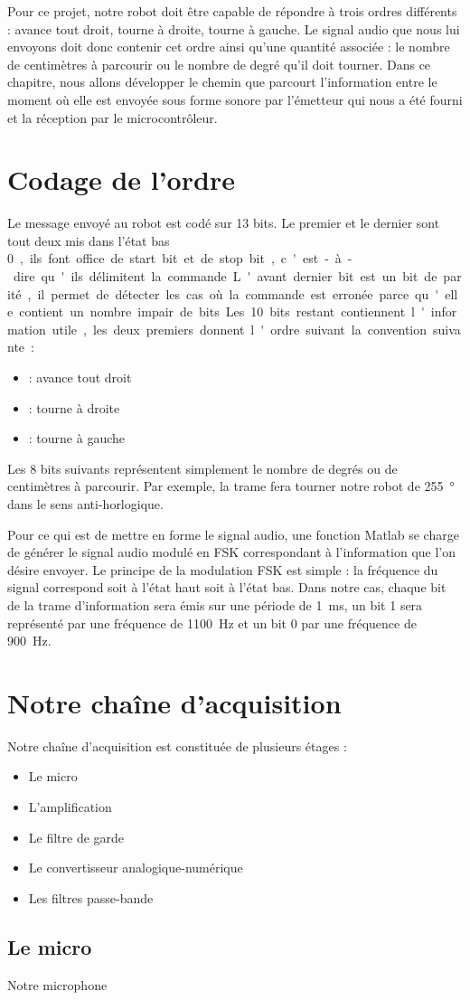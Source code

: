 Pour ce projet, notre robot doit être capable de répondre à trois ordres différents : avance tout droit, tourne à droite, tourne à gauche. Le signal audio que nous lui envoyons doit donc contenir cet ordre ainsi qu'une quantité associée : le nombre de centimètres à parcourir ou le nombre de degré qu'il doit tourner. Dans ce chapitre, nous allons développer le chemin que parcourt l'information entre le moment où elle est envoyée sous forme sonore par l'émetteur qui nous a été fourni et la réception par le microcontrôleur.

\section{Codage de l'ordre}
Le message envoyé au robot est codé sur 13 bits. Le premier et le dernier sont tout deux mis dans l'état bas \SI{0}, ils font office de start bit et de stop bit, c'est-à-dire qu'ils délimitent la commande. L'avant dernier bit est un bit de parité, il permet de détecter les cas où la commande est erronée parce qu'elle contient un nombre impair de bits. Les \SI{10} bits restant contiennent l'information utile, les deux premiers donnent l'ordre suivant la convention suivante :
\begin{itemize}
\item {} : avance tout droit
\item {} : tourne à droite
\item {} : tourne à gauche
\end{itemize}
Les 8 bits suivants représentent simplement le nombre de degrés ou de centimètres à parcourir. Par exemple, la trame  fera tourner notre robot de \SI{255}{\degree} dans le sens anti-horlogique.

Pour ce qui est de mettre en forme le signal audio, une fonction Matlab se charge de générer le signal audio modulé en FSK correspondant à l'information que l'on désire envoyer. Le principe de la modulation FSK est simple : la fréquence du signal correspond soit à l'état haut soit à l'état bas. Dans notre cas, chaque bit de la trame d'information sera émis sur une période de \SI{1}{\milli\second}, un bit 1 sera représenté par une fréquence de \SI{1100}{\hertz} et un bit 0 par une fréquence de \SI{900}{\hertz}. 

\section{Notre chaîne d'acquisition}
Notre chaîne d'acquisition est constituée de plusieurs étages :
\begin{itemize}
\item Le micro
\item L'amplification
\item Le filtre de garde
\item Le convertisseur analogique-numérique
\item Les filtres passe-bande
\end{itemize}

\subsection{Le micro}
Notre microphone 